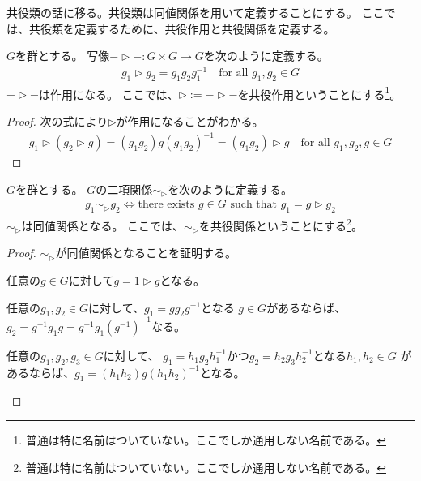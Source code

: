 	共役類の話に移る。共役類は同値関係を用いて定義することにする。
	ここでは、共役類を定義するために、共役作用と共役関係を定義する。

	\begin{definition}[共役作用]\label{def:共役作用} %
		$G$を群とする。
		写像$-\rhd-:G\times G\to G$を次のように定義する。
		\begin{equation*}\begin{split} %
			g_1\rhd g_2 = g_1g_2g_1^{-1} \quad\text{for all }g_1,g_2\in G
		\end{split}\end{equation*} %
		$-\rhd-$は作用になる。
		ここでは、$\rhd:=-\rhd-$を共役作用ということにする\footnote{
			普通は特に名前はついていない。ここでしか通用しない名前である。
		}。
	\end{definition} %
	\begin{proof} 次の式により$\rhd$が作用になることがわかる。
	\begin{equation*}\begin{split} %
		g_1\rhd(g_2\rhd g) = (g_1g_2)g(g_1g_2)^{-1} = (g_1g_2)\rhd g
		\quad\text{for all }g_1,g_2,g\in G
	\end{split}\end{equation*} %
	\end{proof}

	\begin{definition}[共役関係]\label{def:共役関係} %
		$G$を群とする。
		$G$の二項関係$\sim_\rhd$を次のように定義する。
		\begin{equation*}\begin{split} %
			g_1\sim_\rhd g_2 \iff \text{there exists $g\in G$ such that }
			g_1 = g\rhd g_2
		\end{split}\end{equation*} %
		$\sim_\rhd$は同値関係となる。
		ここでは、$\sim_\rhd$を共役関係ということにする\footnote{
			普通は特に名前はついていない。ここでしか通用しない名前である。
		}。
	\end{definition} %
	\begin{proof}$\sim_\rhd$が同値関係となることを証明する。
		\begin{description}\setlength{\itemsep}{-1mm} %
			\item[反射律] 任意の$g\in G$に対して$g=1\rhd g$となる。
			\item[対称律] 任意の$g_1,g_2\in G$に対して、$g_1=gg_2g^{-1}$となる
			$g\in G$があるならば、$g_2=g^{-1}g_1g=g^{-1}g_1(g^{-1})^{-1}$なる。
			\item[推移律] 任意の$g_1,g_2,g_3\in G$に対して、
			$g_1=h_1g_2h_1^{-1}$かつ$g_2=h_2g_3h_2^{-1}$となる$h_1,h_2\in G$
			があるならば、$g_1=(h_1h_2)g(h_1h_2)^{-1}$となる。
		\end{description} %
	\end{proof}

